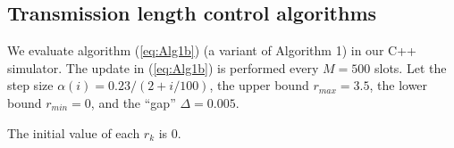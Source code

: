 \documentclass{IEEEtran}
\begin{document}
\subsection{\label{sub:sim_alg}Transmission length control algorithms}

We evaluate algorithm (\ref{eq:Alg1b}) (a variant of Algorithm 1)
in our C++ simulator. The update in (\ref{eq:Alg1b}) is performed
every $M=500$ slots. Let the step size $\alpha(i)=0.23/(2+i/100)$,
the upper bound $r_{max}=3.5$, the lower bound $r_{min}=0$, and
the {}``gap'' $\Delta=0.005$. \begin{comment}
Since $T_{k}^{p}=T_{0}\exp(r_{k})$ is in general not an integer,
link $k$ chooses its payload length to be $\left\lfloor T_{k}^{p}\right\rfloor $
with probability $1-(T_{k}^{p}-\left\lfloor T_{k}^{p}\right\rfloor )$
and $\left\lfloor T_{k}^{p}\right\rfloor +1$ with probability $T_{k}^{p}-\left\lfloor T_{k}^{p}\right\rfloor $.
(Thus link $k$'s mean payload length is $T_{k}^{p}$, leading to
the desired average throughput.)
\end{comment}
{} The initial value of each $r_{k}$ is 0. 
\end{document}
